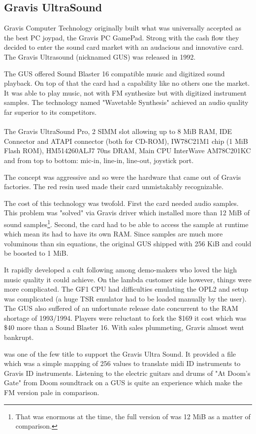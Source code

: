 \subsection{Gravis UltraSound}
Gravis Computer Technology originally built what was universally accepted as the best PC joypad, the Gravis PC GamePad. Strong with the cash flow they decided to enter the sound card market with an audacious and innovative card. The Gravis Ultrasound (nicknamed GUS) was released in 1992.\\
\par
The GUS offered Sound Blaster 16 compatible music and digitized sound playback. On top of that the card had a capability like no others one the market. It was able to play music, not with FM synthesize but with digitized instrument samples. The technology named "Wavetable Synthesis" achieved an audio quality far superior to its competitors.\\


\\
The Gravis UltraSound Pro,  2 SIMM slot allowing up to 8 MiB RAM,  IDE Connector and  ATAPI connector (both for CD-ROM),  IW78C21M1 chip (1 MiB Flash ROM),  HM514260ALJ7 70ns DRAM,  Main CPU InterWave AM78C201KC and  from top to bottom: mic-in, line-in, line-out, joystick port.\\
\par
The concept was aggressive and so were the hardware that came out of Gravis factories. The red resin used made their card unmistakably recognizable.\\
\par
The cost of this technology was twofold. First the card needed audio samples. This problem was "solved" via Gravis driver which installed more than 12 MiB of sound samples\footnote{That was enormous at the time, the full version of \doom was 12 MiB as a matter of comparison.}. Second, the card had to be able to access the sample at runtime which mean its had to have its own RAM. Since samples are much more voluminous than sin equations, the original GUS shipped with 256 KiB and could be boosted to 1 MiB.\\
\par
It rapidly developed a cult following among demo-makers who loved the high music quality it could achieve. On the lambda customer side however, things were more complicated. The GF1 CPU had difficulties emulating the OPL2 and setup was complicated (a huge TSR emulator had to be loaded manually by the user). The GUS also suffered of an unfortunate release date concurrent to the RAM shortage of 1993/1994. Players were reluctant to fork the \$169 it cost which was \$40 more than a Sound Blaster 16. With sales plummeting, Gravis almost went bankrupt.\\
\par
 \doom was one of the few title to support the Gravis Ultra Sound. It provided a  file which was a simple mapping of 256 values to translate midi ID instruments to Gravis ID instruments. Listening to the electric guitars and drums of "At Doom's Gate" from Doom soundtrack on a GUS is quite an experience which make the FM version pale in comparison.